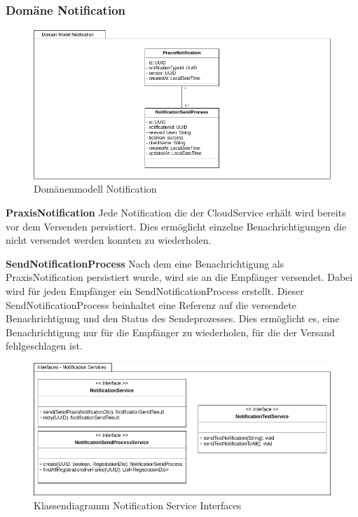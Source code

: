 \clearpage
\subsubsection{Domäne Notification}

\begin{figure}[h]
    \centering
    \begin{minipage}[b]{1.0\textwidth}
        \includegraphics[width=\textwidth]{graphics/Class_Notification_Domain}
        \caption{Domänenmodell Notification}
    \end{minipage}
\end{figure}

\textbf{PraxisNotification}
Jede Notification die der CloudService erhält wird bereits vor dem Versenden persistiert.
Dies ermöglicht einzelne Benachrichtigungen die nicht versendet werden konnten zu wiederholen.

\textbf{SendNotificationProcess}
Nach dem eine Benachrichtigung als PraxisNotification persistiert wurde, wird sie an die Empfänger versendet.
Dabei wird für jeden Empfänger ein SendNotificationProcess erstellt.
Dieser SendNotificationProcess beinhaltet eine Referenz auf die versendete Benachrichtigung und den Status des Sendeprozesses.
Dies ermöglicht es, eine Benachrichtigung nur für die Empfänger zu wiederholen, für die der Versand fehlgeschlagen ist.

\begin{figure}[h]
    \centering
    \begin{minipage}[b]{0.9\textwidth}
        \includegraphics[width=\textwidth]{graphics/Class_Notification_Services}
        \caption{Klassendiagramm Notification Service Interfaces}
    \end{minipage}
\end{figure}


